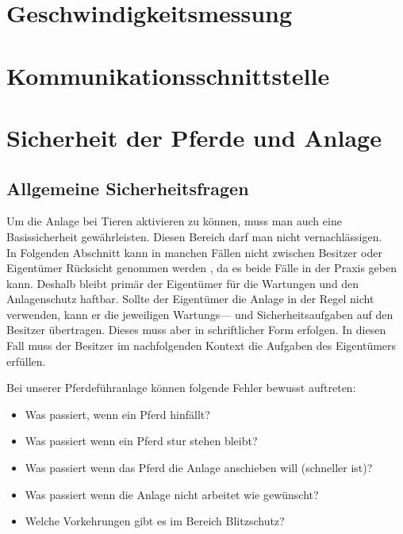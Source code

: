 \newpage
\section{Geschwindigkeitsmessung}
\label{sec:geschwindigkeitsmessung}
\newpage
\section{Kommunikationsschnittstelle}
\label{sec:kommunikationsschnittstelle}
\newpage
\section{Sicherheit der Pferde und Anlage}
\label{sec:sicherheitDerPferdeUndAnlage}

\subsection{Allgemeine Sicherheitsfragen}
\label{sec:allgemeineSicherheitsfragen}

Um die Anlage bei Tieren aktivieren zu können, muss man auch eine Basissicherheit gewährleisten.
Diesen Bereich darf man nicht vernachlässigen. \\ In Folgenden Abschnitt  kann in manchen Fällen nicht zwischen Besitzer oder Eigentümer Rücksicht genommen werden , da es beide Fälle in der Praxis geben kann. Deshalb bleibt primär der Eigentümer für die Wartungen und den Anlagenschutz haftbar. Sollte der Eigentümer die Anlage in der Regel nicht verwenden, kann er die jeweiligen Wartungs--- und Sicherheitsaufgaben auf den Besitzer übertragen. Dieses muss aber in schriftlicher Form erfolgen. In diesen Fall muss der Besitzer im nachfolgenden Kontext die Aufgaben des Eigentümers erfüllen.

Bei unserer Pferdeführanlage können folgende Fehler bewusst auftreten:

\begin{itemize}
\item{Was passiert, wenn ein Pferd hinfällt?}
\item{Was passiert wenn ein Pferd stur stehen bleibt?}
\item{Was passiert wenn das Pferd die Anlage anschieben will (schneller ist)?}
\item{Was passiert wenn die Anlage nicht arbeitet wie gewünscht?}
\item{Welche Vorkehrungen gibt es im Bereich Blitzschutz?}
\end{itemize}

